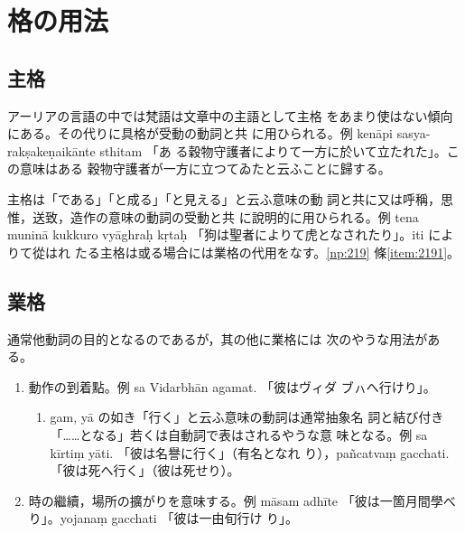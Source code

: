 \section{格の用法}
\subsection{主格}
\numberParagraph
アーリアの言語の中では梵語は文章中の主語として主格
をあまり使はない傾向にある。その代りに具格が受動の動詞と共
に用ひられる。例 kenāpi sasya-rakṣakeṇaikānte sthitam 「あ
る穀物守護者によりて一方に於いて立たれた」。この意味はある
穀物守護者が一方に立つてゐたと云ふことに歸する。

\numberParagraph
主格は「である」「と成る」「と見える」と云ふ意味の動
詞と共に又は呼稱，思惟，送致，造作の意味の動詞の受動と共
に說明的に用ひられる。例 tena muninā kukkuro vyāghraḥ
kṛtaḥ 「狗は聖者によりて虎となされたり」。iti によりて從はれ
たる主格は或る場合には業格の代用をなす。\ref{np:219} 條\ref{item:2191}。

\subsection{業格}
\numberParagraph
通常他動詞の目的となるのであるが，其の他に業格には
次のやうな用法がある。
\begin{enumerate}[label=(\arabic*)]
\item 動作の到着點。例 sa Vidarbhān agamat. 「彼はヴィダ
ブㇵへ行けり」。
\
\begin{enumerate}[label=(\alph*)]
\item gam, yā の如き「行く」と云ふ意味の動詞は通常抽象名
詞と結び付き「……となる」若くは自動詞で表はされるやうな意
味となる。例 sa kīrtiṃ yāti. 「彼は名譽に行く」（有名となれ
り），pañcatvaṃ gacchati. 「彼は死へ行く」（彼は死せり）。
\end{enumerate}
\item 時の繼續，場所の擴がりを意味する。例 māsam adhīte
「彼は一箇月間學べり」。yojanaṃ gacchati 「彼は一由旬行け
り」。
\end{enumerate}

